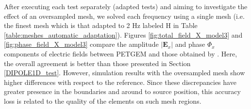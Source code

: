 \documentclass[review]{elsarticle}
\begin{document}
After executing each test separately (adapted tests) and aiming to investigate the effect of an oversampled mesh, we solved each frequency using a single mesh (i.e. the finest mesh which is that adapted to 2 Hz labeled H in Table \ref{table:meshes_automatic_adaptation}). Figures \ref{fig:total_field_X_model3} and \ref{fig:phase_field_X_model3} compare the amplitude $|\mathbf{E}_{x}|$ and phase $\Phi_{x}$ components of electric fields between PETGEM and those obtained by \citet{Weiss2006a}. Here, the overall agreement is better than those presented in Section \ref{DIPOLE1D_test}. However, simulation results with the oversampled mesh show higher differences with respect to the reference. Since these discrepancies have greater presence in the boundaries and around to source position, this accuracy loss is related to the quality of the elements on such mesh regions. 
\end{document}
